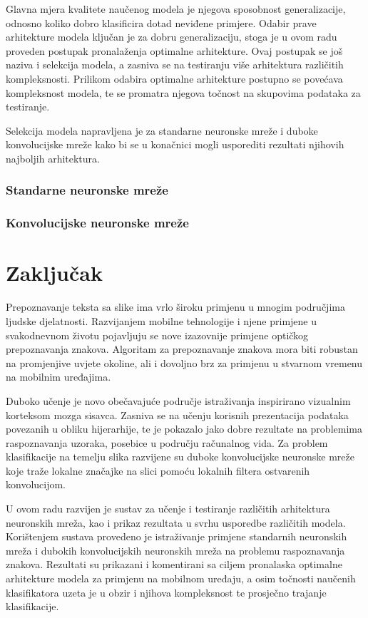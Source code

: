 \documentclass[lmodern, utf8, diplomski, numeric]{fer}
\begin{document}
Glavna mjera kvalitete naučenog modela je njegova sposobnost generalizacije, odnosno koliko dobro klasificira dotad neviđene primjere. Odabir prave arhitekture modela ključan je za dobru generalizaciju, stoga je u ovom radu proveden postupak pronalaženja optimalne arhitekture. Ovaj postupak se još naziva i selekcija modela, a zasniva se na testiranju više arhitektura različitih kompleksnosti. Prilikom odabira optimalne arhitekture postupno se povećava kompleksnost modela, te se promatra njegova točnost na skupovima podataka za testiranje. 

Selekcija modela napravljena je za standarne neuronske mreže i duboke konvolucijske mreže kako bi se u konačnici mogli usporediti rezultati njihovih najboljih arhitektura.

\subsection{Standarne neuronske mreže}

\subsection{Konvolucijske neuronske mreže}


\chapter{Zaključak}

Prepoznavanje teksta sa slike ima vrlo široku primjenu u mnogim područjima ljudske djelatnosti. Razvijanjem mobilne tehnologije i njene primjene u svakodnevnom životu pojavljuju se nove izazovnije primjene optičkog prepoznavanja znakova. Algoritam za prepoznavanje znakova mora biti robustan na promjenjive uvjete okoline, ali i dovoljno brz za primjenu u stvarnom vremenu na mobilnim uređajima. 

Duboko učenje je novo obečavajuće područje istraživanja inspirirano vizualnim korteksom mozga sisavca. Zasniva se na učenju korisnih prezentacija podataka povezanih u obliku hijerarhije, te je pokazalo jako dobre rezultate na problemima raspoznavanja uzoraka, posebice u području računalnog vida. Za problem klasifikacije na temelju slika razvijene su duboke konvolucijske neuronske mreže koje traže lokalne značajke na slici pomoću lokalnih filtera ostvarenih konvolucijom. 

U ovom radu razvijen je sustav za učenje i testiranje različitih arhitektura neuronskih mreža, kao i prikaz rezultata u svrhu usporedbe različitih modela. Korištenjem sustava provedeno je istraživanje primjene standarnih neuronskih mreža i dubokih konvolucijskih neuronskih mreža na problemu raspoznavanja znakova. Rezultati su prikazani i komentirani sa ciljem pronalaska optimalne arhitekture modela za primjenu na mobilnom uređaju, a osim točnosti naučenih klasifikatora uzeta je u obzir i njihova kompleksnost te prosječno trajanje klasifikacije.
\end{document}
